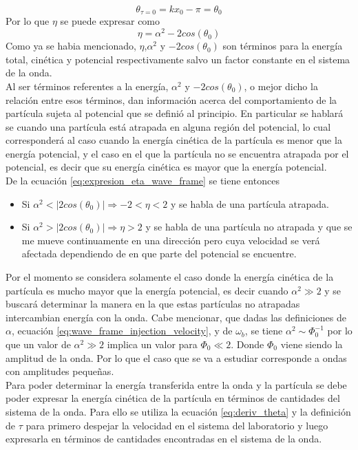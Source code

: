 \documentclass[../tesis_main_file.tex]{subfiles}
\begin{document}
\begin{equation}
\label{eq:wave_frame_injection_phase}
\theta_{\tau=0}=kx_0-\pi=\theta_0
\end{equation}
Por lo que $\eta$ se puede expresar como
\begin{equation}
\label{eq:expresion_eta_wave_frame}
\eta = \alpha^2 -2cos(\theta_0)
\end{equation}
Como ya se habia mencionado, $\eta$,$\alpha^2$ y $-2cos(\theta_0)$ son términos para la energía total, cinética y potencial respectivamente salvo un factor constante en el sistema de la onda.\\
Al ser términos referentes a la energía, $\alpha^2$ y $-2cos(\theta_0)$, o mejor dicho la relación entre esos términos, dan información acerca del comportamiento de la partícula sujeta al potencial que se definió al principio. En particular se hablará se cuando una partícula está atrapada en alguna región del potencial, lo cual corresponderá al caso cuando la energía cinética de la partícula es menor que la energía potencial, y el caso en el que la partícula no se encuentra atrapada por el potencial, es decir que su energía cinética es mayor que la energía potencial.\\
De la ecuación \ref{eq:expresion_eta_wave_frame} se tiene entonces
\begin{itemize}
\item Si $\alpha^2 < |2cos(\theta_0)| \Rightarrow -2<\eta<2$ y se habla de una partícula atrapada.
\item Si $\alpha^2 > |2cos(\theta_0)| \Rightarrow \eta>2$ y se habla de una partícula no atrapada y que se me mueve continuamente en una dirección pero cuya velocidad se verá afectada dependiendo de en que parte del potencial se encuentre.
\end{itemize}
Por el momento se considera solamente el caso donde la energía cinética de la partícula es mucho mayor que la energía potencial, es decir cuando $\alpha^2 \gg 2$ y se buscará determinar la manera en la que estas partículas no atrapadas intercambian energía con la onda. Cabe mencionar, que dadas las definiciones de $\alpha$, ecuación \ref{eq:wave_frame_injection_velocity}, y de $\omega_b$, se tiene $\alpha^2 \sim \Phi_0^{-1}$ por lo que un valor de $\alpha^2 \gg 2$ implica un valor para $\Phi_0 \ll 2$. Donde $\Phi_0$ viene siendo la amplitud de la onda. Por lo que el caso que se va a estudiar corresponde a ondas con amplitudes pequeñas.\\
Para poder determinar la energía transferida entre la onda y la partícula se debe poder expresar la energía cinética de la partícula en términos de cantidades del sistema de la onda. Para ello se utiliza la ecuación \ref{eq:deriv_theta} y la definición de $\tau$ para primero despejar la velocidad en el sistema del laboratorio y luego expresarla en términos de cantidades encontradas en el sistema de la onda.
\end{document}
